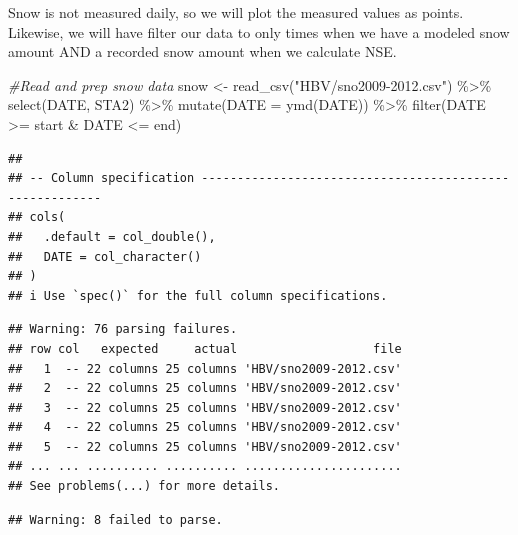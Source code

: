 \documentclass[
]{book}
\newenvironment{Shaded}{\begin{snugshade}}{\end{snugshade}}
\newcommand{\AttributeTok}[1]{\textcolor[rgb]{0.77,0.63,0.00}{#1}}
\newcommand{\CommentTok}[1]{\textcolor[rgb]{0.56,0.35,0.01}{\textit{#1}}}
\newcommand{\FunctionTok}[1]{\textcolor[rgb]{0.00,0.00,0.00}{#1}}
\newcommand{\NormalTok}[1]{#1}
\newcommand{\OtherTok}[1]{\textcolor[rgb]{0.56,0.35,0.01}{#1}}
\newcommand{\SpecialCharTok}[1]{\textcolor[rgb]{0.00,0.00,0.00}{#1}}
\newcommand{\StringTok}[1]{\textcolor[rgb]{0.31,0.60,0.02}{#1}}
\begin{document}
Snow is not measured daily, so we will plot the measured values as points. Likewise, we will have filter our data to only times when we have a modeled snow amount AND a recorded snow amount when we calculate NSE.

\begin{Shaded}
\begin{Highlighting}[]
\CommentTok{\#Read and prep snow data}
\NormalTok{snow }\OtherTok{\textless{}{-}} \FunctionTok{read\_csv}\NormalTok{(}\StringTok{"HBV/sno2009{-}2012.csv"}\NormalTok{) }\SpecialCharTok{\%\textgreater{}\%}
         \FunctionTok{select}\NormalTok{(DATE, STA2) }\SpecialCharTok{\%\textgreater{}\%}
         \FunctionTok{mutate}\NormalTok{(}\AttributeTok{DATE =} \FunctionTok{ymd}\NormalTok{(DATE)) }\SpecialCharTok{\%\textgreater{}\%}
         \FunctionTok{filter}\NormalTok{(DATE }\SpecialCharTok{\textgreater{}=}\NormalTok{ start }\SpecialCharTok{\&}\NormalTok{ DATE }\SpecialCharTok{\textless{}=}\NormalTok{ end)}
\end{Highlighting}
\end{Shaded}

\begin{verbatim}
## 
## -- Column specification --------------------------------------------------------
## cols(
##   .default = col_double(),
##   DATE = col_character()
## )
## i Use `spec()` for the full column specifications.
\end{verbatim}

\begin{verbatim}
## Warning: 76 parsing failures.
## row col   expected     actual                   file
##   1  -- 22 columns 25 columns 'HBV/sno2009-2012.csv'
##   2  -- 22 columns 25 columns 'HBV/sno2009-2012.csv'
##   3  -- 22 columns 25 columns 'HBV/sno2009-2012.csv'
##   4  -- 22 columns 25 columns 'HBV/sno2009-2012.csv'
##   5  -- 22 columns 25 columns 'HBV/sno2009-2012.csv'
## ... ... .......... .......... ......................
## See problems(...) for more details.
\end{verbatim}

\begin{verbatim}
## Warning: 8 failed to parse.
\end{verbatim}
\end{document}
